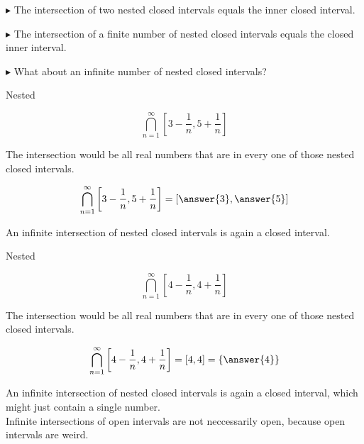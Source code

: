 \documentclass{ximera}
\begin{document}
$\blacktriangleright$  The intersection of two nested closed intervals equals the inner closed interval.

$\blacktriangleright$  The intersection of a finite number of nested closed intervals equals the closed inner interval.

$\blacktriangleright$ What about an infinite number of nested closed intervals?



\begin{example} Nested


\[ \bigcap_{n=1}^{\infty}   \left[3 - \frac{1}{n}, 5 + \frac{1}{n}\right]     \]



The intersection would be all real numbers that are in every one of those nested closed intervals.


\[ \bigcap_{n=1}^{\infty}   \left[3 - \frac{1}{n}, 5 + \frac{1}{n}\right]  = \left[\answer{3}, \answer{5}\right]   \]





\end{example} 


An infinite intersection of nested closed intervals is again a closed interval. \\






\begin{example} Nested


\[ \bigcap_{n=1}^{\infty}   \left[4 - \frac{1}{n}, 4 +  \frac{1}{n}\right]     \]



The intersection would be all real numbers that are in every one of those nested closed intervals.


\[ \bigcap_{n=1}^{\infty}   \left[4 -  \frac{1}{n}, 4 + \frac{1}{n}\right]    = [4, 4] = \left\{ \answer{4} \right\}  \]





\end{example}


An infinite intersection of nested closed intervals is again a closed interval, which might just contain a single number. \\





Infinite intersections of open intervals are not neccessarily open, because open intervals are weird.
\end{document}
